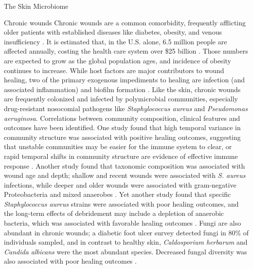 \documentclass[oneside,12pt,final]{sty/ucthesis-CA2012}
\begin{document}
\begin{mainmatter}
\begin{section}{The Skin Microbiome}
\begin{subsection}{Chronic wounds}
Chronic wounds are a common comorbidity, frequently afflicting older patients with established diseases like diabetes, obesity, and venous insufficiency \cite{RN2, RN3, RN4}.  It is estimated that, in the U.S. alone, 6.5 million people are affected annually, costing the health care system over \$25 billion \cite{RN4}. Those numbers are expected to grow as the global population ages, and incidence of obesity continues to increase. While host factors are major contributors to wound healing, two of the primary exogenous impediments to healing are infection (and associated inflammation) and biofilm formation \cite{RN5, RN29}. Like the skin, chronic wounds are frequently colonized and infected by polymicrobial communities, especially drug-resistant nosocomial pathogens like \textit{Staphylococcus aureus} and \textit{Pseudomonas aeruginosa}. Correlations between community composition, clinical features and outcomes have been identified. One study found that high temporal variance in community structure was associated with positive healing outcomes, suggesting that unstable communities may be easier for the immune system to clear, or rapid temporal shifts in community structure are evidence of effective immune response \cite{RN7}. Another study found that taxonomic composition was associated with wound age and depth; shallow and recent wounds were associated with \textit{S. aureus} infections, while deeper and older wounds were associated with gram-negative Proteobacteria and mixed anaerobes \cite{RN167}. Yet another study found that specific \textit{Staphylococcus aureus} strains were associated with poor healing outcomes, and the long-term effects of debridement may include a depletion of anaerobic bacteria, which was associated with favorable healing outcomes \cite{RN8}. Fungi are also abundant in chronic wounds; a diabetic foot ulcer survey detected fungi in 80\% of individuals sampled, and in contrast to healthy skin, \textit{Caldosporium herbarum} and \textit{Candida albicans} were the most abundant species. Decreased fungal diversity was also associated with poor healing outcomes \cite{RN20, RN19}. 
\end{subsection}
\end{section}



\end{mainmatter}
\end{document}

